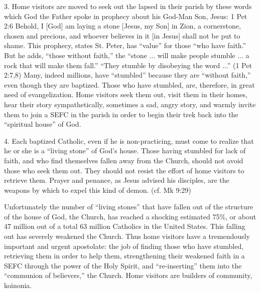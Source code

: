 \documentclass[oneside]{book}
\begin{document}
3. Home visitors are moved to seek out the lapsed in their parish by these words
which God the Father spoke in prophecy about his God-Man Son, Jesus:
1 Pet 2:6
Behold, I [God] am laying a stone [Jesus, my Son] in Zion, a cornerstone, chosen
and precious, and whoever believes in it [in Jesus] shall not be put to shame.
This prophecy, states St. Peter, has ``value'' for those ``who have faith.'' But
he adds, ``those without faith,'' the ``stone ... will make people stumble ... a
rock that will make them fall.'' ``They stumble by disobeying the word ...'' (1
Pet 2:7,8) Many, indeed millions, have ``stumbled'' because they are ``without
faith,'' even though they are baptized. Those who have stumbled, are, therefore,
in great need of evangelization.
Home visitors seek them out, visit them in their homes, hear their story
sympathetically, sometimes a sad, angry story, and warmly invite them to join a
SEFC in the parish in order to begin their trek back into the ``spiritual
house'' of God.

4. Each baptized Catholic, even if he is non-practicing, must come to realize
that he or she is a ``living stone'' of God's house. Those having stumbled for
lack of faith, and who find themselves fallen away from the Church, should not
avoid those who seek them out. They should not resist the effort of home
visitors to retrieve them. Prayer and penance, as Jesus advised his disciples,
are the weapons by which to expel this kind of demon. (cf. Mk 9:29)

Unfortunately the number of ``living stones'' that have fallen out of the
structure of the house of God, the Church, has reached a shocking estimated
75\%, or about 47 million out of a total 63 million Catholics in the United
States. This falling out has severely weakened the Church. Thus home visitors
have a tremendously important and urgent apostolate: the job of finding those
who have stumbled, retrieving them in order to help them, strengthening their
weakened faith in a SEFC through the power of the Holy Spirit, and
``re-inserting'' them into the ``communion of believers,'' the Church. Home
visitors are builders of community, koinonia.
\end{document}
